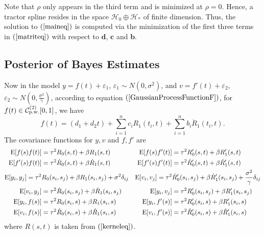 Note that $\rho$ only appears in the third term and is minimized at $\rho=0$. Hence, a tractor spline resides in the space $\mathcal{H}_0\oplus \mathcal{H}_*$ of finite dimension. Thus, the solution to $(\ref{maineq})$ is computed via the minimization of the first three terms in $(\ref{matriteq})$ with respect to $\mathbf{d}$, $\mathbf{c}$ and $\mathbf{b}$.



\subsection{Posterior of Bayes Estimates}


Now in the model $y=f(t)+\varepsilon_1$, $\varepsilon_1 \sim N(0,\sigma^2)$, and $v=f '(t)+\varepsilon_2$, $\varepsilon_2\sim N\left(0, \frac{\sigma^2}{\gamma}\right)$, according to equation $(\ref{GaussianProcessFunctionF})$, for $f(t) \in \mathcal{C}_{\mbox{\scriptsize p.w.}}^{(2)}[0,1]$, we have 
\begin{equation}
f(t)=(d_1+d_2t)+\sum_{i=1}^{n}c_iR_1(t_i,t)+\sum_{i=1}^{n}b_i\dot{R}_1(t_i,t).
\end{equation}
The covariance functions for $y,v$ and $f , f '$ are \small
\begin{align*}
\mathrm{E}\lbrack f(s)f (t)\rbrack &=\tau^2R_0(s,t)+\beta R_1(s,t) & \mathrm{E} \lbrack f(s)f '(t)\rbrack&=\tau^2R_0'(s,t)+\beta R_1'(s,t) \\
\mathrm{E}\lbrack f '(s)f (t)\rbrack&=\tau^2\dot{R}_0(s,t)+\beta\dot{R}_1(s,t) & \mathrm{E}\lbrack f '(s)f '(t)\rbrack&=\tau^2\dot{R}'_0(s,t)+\beta\dot{R}'_1(s,t) \\
\footnotesize \mathrm{E}\lbrack y_i,y_j\rbrack=\tau^2 & R_0(s_i,s_j)+\beta R_1(s_i,s_j)+\sigma^2\delta_{ij}   & 
\mathrm{E} \lbrack v_i,v_j\rbrack=\tau^2&\dot{R}'_0(s_i,s_j)+\beta\dot{R}'_1(s_i,s_j) +\frac{\sigma^2}{\gamma}\delta_{ij} \\ 
\normalsize
\mathrm{E}\lbrack v_i,y_j\rbrack&=\tau^2\dot{R}_0(s_i,s_j)+\beta \dot{R}_1(s_i,s_j) &
\mathrm{E}\lbrack y_i,v_j\rbrack&=\tau^2R_0'(s_i,s_j)+\beta R_1'(s_i,s_j)\\
\mathrm{E}\lbrack y_i,f(s)\rbrack&=\tau^2 R_0(s_i,s)+\beta R_1(s_i,s)  & \mathrm{E}\lbrack y_i,f '(s)\rbrack&=\tau^2 R'_0(s_i,s)+\beta R'_1(s_i,s)  \\
\mathrm{E}\lbrack v_i,f(s)\rbrack&=\tau^2 \dot{R}_0(s_i,s)+\beta \dot{R}_1(s_i,s) & \mathrm{E}\lbrack v_i,f '(s)\rbrack&=\tau^2\dot{R}'_0(s_i,s)+\beta \dot{R}'_1(s_i,s)
\end{align*}
\normalsize where $R(s,t)$ is taken from $(\ref{kerneleq})$. 


